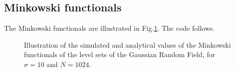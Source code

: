 \subsection{Minkowski functionals}

The Minkowski functionals are illustrated in Fig.\ref{fig:grf:python:Minkowski}. The code follows.

\begin{figure}[htbp]
 \centering\caption{Illustration of the simulated and analytical values of the Minkowski functionals of the level sets of the Gaussian Random Field, for $\sigma=10$ and $N=1024$.}%
 
 
 \label{fig:grf:python:Minkowski}%
\end{figure}

